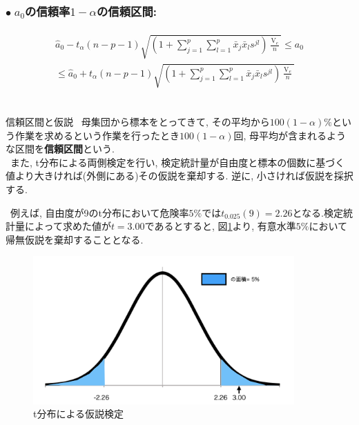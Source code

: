 \subsubsection*{$\bullet \; a_0$の信頼率$1-\alpha$の信頼区間:}
  \begin{align}
    \label{eq:CI_0}
    \begin{split}
      \hat{a}_0-t_{\alpha}(n-p-1)\sqrt{\left(1+\sum_{j=1}^p\sum_{l=1}^p\bar{x}_j\bar{x}_ls^{jl}\right)\frac{\operatorname{V}_e}{n}} \leq a_0\\
      \leq \hat{a}_0+t_{\alpha}(n-p-1)\sqrt{\left(1+\sum_{j=1}^p\sum_{l=1}^p\bar{x}_j\bar{x}_ls^{jl}\right)\frac{\operatorname{V}_e}{n}}
    \end{split}
  \end{align}\\

\begin{itembox}[l]{信頼区間と仮説}
  \ 母集団から標本をとってきて, その平均から$100(1-\alpha)\%$という作業を求めるという作業を行ったとき$100(1-\alpha)$回, 母平均が含まれるような区間を{\bf 信頼区間}という.\\ 
  
  \ また, t分布による両側検定を行い, 検定統計量が自由度と標本の個数に基づく値より大きければ(外側にある)その仮説を棄却する. 逆に, 小さければ仮説を採択する.

  \ 例えば, 自由度が9のt分布において危険率$5\%$では$t_{0.025}(9)=2.26$となる.検定統計量によって求めた値が$t=3.00$であるとすると, 図\ref{fig:kasetsu}より, 有意水準$5\%$において帰無仮説を棄却することとなる.
\end{itembox}

\begin{figure}[htb]
  \centering
  \includegraphics[width=10cm]{../pics/kasetsu.png}
  \caption{t分布による仮説検定}
  \label{fig:kasetsu}
\end{figure}

\newpage

